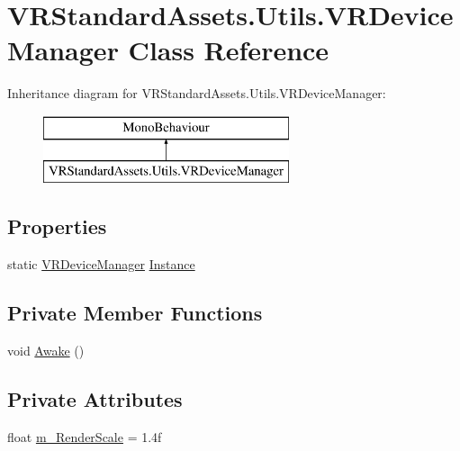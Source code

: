 \hypertarget{class_v_r_standard_assets_1_1_utils_1_1_v_r_device_manager}{}\section{V\+R\+Standard\+Assets.\+Utils.\+V\+R\+Device\+Manager Class Reference}
\label{class_v_r_standard_assets_1_1_utils_1_1_v_r_device_manager}
Inheritance diagram for V\+R\+Standard\+Assets.\+Utils.\+V\+R\+Device\+Manager\+:\begin{figure}[H]
\begin{center}
\leavevmode
\includegraphics[height=2.000000cm]{class_v_r_standard_assets_1_1_utils_1_1_v_r_device_manager}
\end{center}
\end{figure}
\subsection*{Properties}
\begin{DoxyCompactItemize}
\item 
static \mbox{\hyperlink{class_v_r_standard_assets_1_1_utils_1_1_v_r_device_manager}{V\+R\+Device\+Manager}} \mbox{\hyperlink{class_v_r_standard_assets_1_1_utils_1_1_v_r_device_manager_ae45832ea5dead7782321d7e3ae25992f}{Instance}}
\end{DoxyCompactItemize}
\subsection*{Private Member Functions}
\begin{DoxyCompactItemize}
\item 
void \mbox{\hyperlink{class_v_r_standard_assets_1_1_utils_1_1_v_r_device_manager_a8ad85381877fb58fff146d9223e69584}{Awake}} ()
\end{DoxyCompactItemize}
\subsection*{Private Attributes}
\begin{DoxyCompactItemize}
\item 
float \mbox{\hyperlink{class_v_r_standard_assets_1_1_utils_1_1_v_r_device_manager_a6e9a73ee11c79c9adeca5d5246fc03d3}{m\+\_\+\+Render\+Scale}} = 1.\+4f
\end{DoxyCompactItemize}
